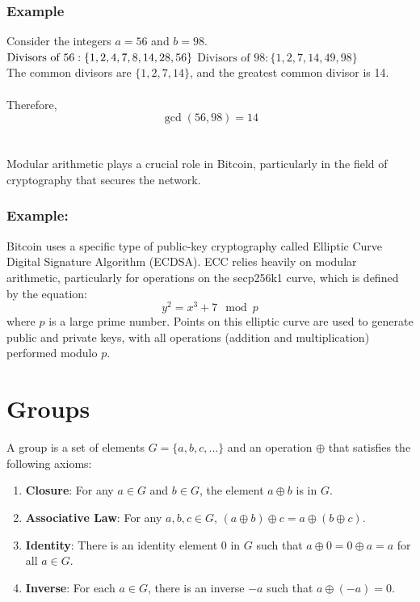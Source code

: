 \documentclass[11pt, letterpaper]{article}
\begin{document}
\subsubsection*{Example}

Consider the integers \(a = 56\) and \(b = 98\). \\ 
\(
\text{Divisors of } 56: \{1, 2, 4, 7, 8, 14, 28, 56\} \\
\)
\(
\text{Divisors of } 98: \{1, 2, 7, 14, 49, 98\}
\)
\\
The common divisors are \(\{1, 2, 7, 14\}\), and the greatest common divisor is 14. 
\\ \\
Therefore,
\[
\gcd(56, 98) = 14
\]

\section*{}
Modular arithmetic plays a crucial role in Bitcoin, particularly in the field of cryptography that secures the network.

\subsubsection*{Example:}
Bitcoin uses a specific type of public-key cryptography called Elliptic Curve Digital Signature Algorithm (ECDSA). ECC relies heavily on modular arithmetic, particularly for operations on the secp256k1 curve, which is defined by the equation:
\[
y^2 = x^3 + 7 \mod p
\]
where \( p \) is a large prime number. Points on this elliptic curve are used to generate public and private keys, with all operations (addition and multiplication) performed modulo \( p \).

\section{Groups}

A group is a set of elements \( G = \{a, b, c, \ldots\} \) and an operation \( \oplus \) that satisfies the following axioms:

\begin{enumerate}
    \item \textbf{Closure}: For any \( a \in G \) and \( b \in G \), the element \( a \oplus b \) is in \( G \).
    \item \textbf{Associative Law}: For any \( a, b, c \in G \), \( (a \oplus b) \oplus c = a \oplus (b \oplus c) \).
    \item \textbf{Identity}: There is an identity element 0 in \( G \) such that \( a \oplus 0 = 0 \oplus a = a \) for all \( a \in G \).
    \item \textbf{Inverse}: For each \( a \in G \), there is an inverse \(-a\) such that \( a \oplus (-a) = 0 \).
\end{enumerate}
\end{document}
